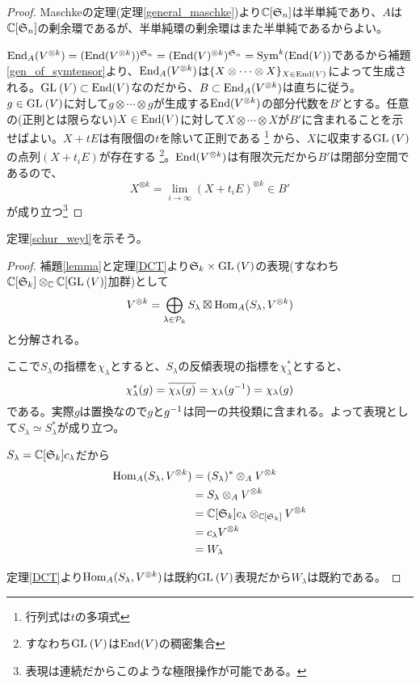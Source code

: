 \documentclass{ltjsreport}
\begin{document}
\begin{proof}
  Maschkeの定理(定理\ref{general_maschke})より$\mathbb{C}[\mathfrak{S}_n]$は半単純であり、$A$は$\mathbb{C}[\mathfrak{S}_n]$の剰余環であるが、半単純環の剰余環はまた半単純であるからよい。

  $\text{End}_A(V^{\otimes k})=(\text{End}(V^{\otimes k}))^{\mathfrak{S}_n}=(\text{End}(V)^{\otimes k})^{\mathfrak{S}_n}=\text{Sym}^k(\text{End}(V))$であるから補題\ref{gen_of_symtensor}より、$\text{End}_A(V^{\otimes k})$は$\{X\otimes\cdots\otimes X\}_{X\in\text{End}(V)}$によって生成される。$\text{GL}\:(V)\subset\text{End}(V)$なのだから、$B\subset \text{End}_A(V^{\otimes k})$は直ちに従う。$g\in\text{GL}\:(V)$に対して$g\otimes \cdots\otimes g$が生成する$\text{End}(V^{\otimes k})$の部分代数を$B'$とする。任意の(正則とは限らない)$X\in\text{End}(V)$に対して$X\otimes \cdots\otimes X$が$B'$に含まれることを示せばよい。$X+tE$は有限個の$t$を除いて正則である
  \footnote{
    行列式は$t$の多項式
  }
  から、$X$に収束する$\text{GL}\:(V)$の点列$(X+t_iE)$が存在する
  \footnote{
    すなわち$\text{GL}\:(V)$は$\text{End}(V)$の稠密集合
  }。$\text{End}(V^{\otimes k})$は有限次元だから$B'$は閉部分空間であるので、
  \[
  X^{\otimes k}=\lim_{i\rightarrow\infty}(X+t_iE)^{\otimes k}\in B'  
  \]
  が成り立つ\footnote{
    表現は連続だからこのような極限操作が可能である。
  }
\end{proof}

定理\ref{schur_weyl}を示そう。
\begin{proof}
  補題\ref{lemma}と定理\ref{DCT}より$\mathfrak{S}_k\times\text{GL}\:(V)$の表現(すなわち$\mathbb{C}[\mathfrak{S}_k]\otimes_{\mathbb{C}}\mathbb{C}[\text{GL}\:(V)]$加群)として
  \[
  V^{\otimes k}=\bigoplus_{\lambda\in\mathcal{P}_k}S_\lambda\boxtimes \text{Hom}_A(S_\lambda,V^{\otimes k})  
  \]
  と分解される。
  
  ここで$S_\lambda$の指標を$\chi_\lambda$とすると、$S_\lambda$の反傾表現の指標を$\chi^*_\lambda$とすると、
  \[
  \chi^*_\lambda(g)=\overline{\chi_\lambda(g)}=\chi_\lambda(g^{-1})=\chi_\lambda(g)  
  \]
  である。実際$g$は置換なので$g$と$g^{-1}$は同一の共役類に含まれる。よって表現として$S_\lambda\simeq S_\lambda^*$が成り立つ。

  $S_\lambda=\mathbb{C}[\mathfrak{S}_k]c_\lambda$だから
  \begin{align*}
    \text{Hom}_A(S_\lambda,V^{\otimes k})
    &=(S_\lambda)^*\otimes_AV^{\otimes k}\\
    &=S_\lambda\otimes_AV^{\otimes k}\\
    &=\mathbb{C}[\mathfrak{S}_k]c_\lambda\otimes_{\mathbb{C}[\mathfrak{S}_k]}V^{\otimes k}\\
    &=c_\lambda V^{\otimes k}\\
    &=W_\lambda
  \end{align*}

  定理\ref{DCT}より$\text{Hom}_A(S_\lambda,V^{\otimes k})$は既約$\text{GL}\:(V)$表現だから$W_\lambda$は既約である。
\end{proof}
\end{document}
